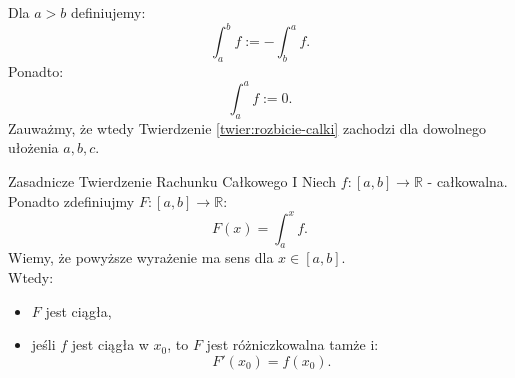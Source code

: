 \documentclass{article}
\newcounter{defi}
\numberwithin{defi}{section}
\numberwithin{defi}{section}
\newcommand{\R}{\mathbb{R}}
\begin{document}
\begin{defr}{}
    Dla $a > b$ definiujemy: \begin{equation}
        \int_{a}^{b} f := -\int_{b}^{a} f.
    \end{equation} Ponadto: \begin{equation}
        \int_{a}^{a} f := 0.
    \end{equation} Zauważmy, że wtedy Twierdzenie \ref*{twier:rozbicie-calki} zachodzi dla dowolnego ułożenia $a, b, c$. 
\end{defr}

\begin{twier}[label=twier:ZTRCI]{Zasadnicze Twierdzenie Rachunku Całkowego I}
    Niech $f: [a, b] \to \R$ -  całkowalna. Ponadto zdefiniujmy $F: [a, b] \to \R$: \begin{equation}
        F(x) = \int_{a}^{x} f.
    \end{equation} Wiemy, że powyższe wyrażenie ma sens dla $x \in [a, b]$.\\
    Wtedy: \begin{itemize}
        \item $F$ jest ciągła,
        \item jeśli $f$ jest ciągła w $x_0$, to $F$ jest różniczkowalna tamże i: \begin{equation}
            F'(x_0) = f(x_0).
        \end{equation}
    \end{itemize} 
\end{twier}
\end{document}
